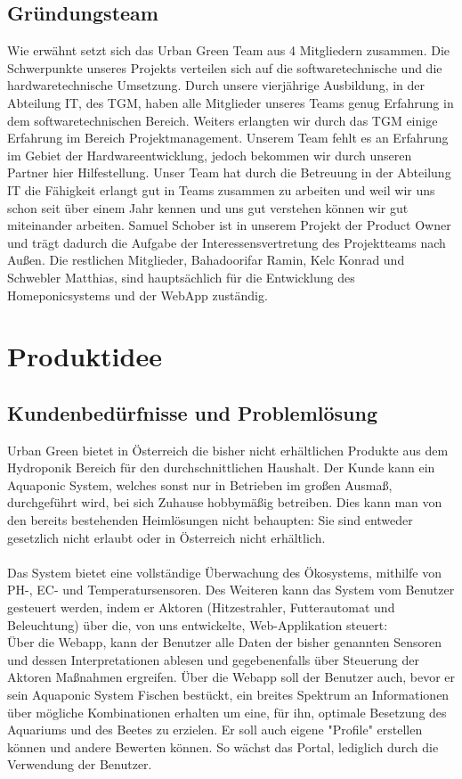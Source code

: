 \documentclass[11pt]{article}
\begin{document}
\subsection{Gründungsteam}
Wie erwähnt setzt sich das Urban Green Team aus 4 Mitgliedern zusammen.
Die Schwerpunkte unseres Projekts verteilen sich auf die softwaretechnische und die hardwaretechnische Umsetzung. Durch unsere vierjährige Ausbildung, in der Abteilung IT, des TGM, haben alle Mitglieder unseres Teams genug Erfahrung in dem softwaretechnischen Bereich. Weiters erlangten wir durch das TGM einige Erfahrung im Bereich Projektmanagement.
Unserem Team fehlt es an Erfahrung im Gebiet der Hardwareentwicklung, jedoch bekommen wir durch unseren Partner hier Hilfestellung.
Unser Team hat durch die Betreuung in der Abteilung IT die Fähigkeit erlangt gut in Teams zusammen zu arbeiten und weil wir uns schon seit über einem Jahr kennen und uns gut verstehen können wir gut miteinander arbeiten.
Samuel Schober ist in unserem Projekt der Product Owner und trägt dadurch die Aufgabe der Interessensvertretung des Projektteams nach Außen. Die restlichen Mitglieder, Bahadoorifar Ramin, Kelc Konrad und Schwebler Matthias, sind hauptsächlich für die Entwicklung des Homeponicsystems und der WebApp zuständig.
\clearpage
\section{Produktidee}
\subsection{Kundenbed\"urfnisse und Probleml\"osung}
Urban Green bietet in \"Osterreich die bisher nicht erh\"altlichen Produkte aus dem Hydroponik Bereich f\"ur den durchschnittlichen Haushalt. Der Kunde kann ein Aquaponic System, welches sonst nur in Betrieben im
großen Ausmaß, durchgef\"uhrt wird, bei sich Zuhause hobbym\"aßig betreiben. Dies kann man von den bereits bestehenden Heiml\"osungen nicht behaupten: Sie sind entweder gesetzlich nicht erlaubt oder in \"Osterreich nicht erh\"altlich.\\
\\ Das System bietet eine vollst\"andige \"Uberwachung des Ökosystems, mithilfe von PH-, EC- und Temperatursensoren. Des Weiteren kann das System vom Benutzer gesteuert werden, indem er Aktoren (Hitzestrahler, Futterautomat und Beleuchtung) \"uber die, von uns entwickelte, Web-Applikation steuert:
\\ \"Uber die Webapp, kann der Benutzer alle Daten der bisher genannten Sensoren und dessen Interpretationen ablesen und gegebenenfalls \"uber Steuerung der Aktoren Maßnahmen ergreifen. \"Uber die Webapp soll der Benutzer auch, bevor er sein Aquaponic System Fischen best\"uckt, ein breites Spektrum an Informationen \"uber m\"ogliche Kombinationen erhalten um eine, f\"ur ihn, optimale Besetzung des Aquariums und des Beetes zu erzielen. Er soll auch eigene "Profile" erstellen k\"onnen und andere Bewerten k\"onnen. So w\"achst das Portal, lediglich durch die Verwendung der Benutzer.
\newpage
\end{document}

